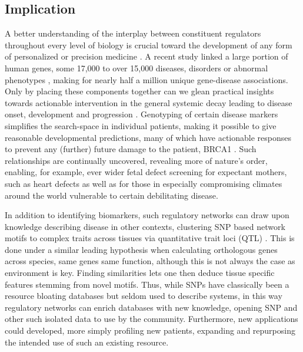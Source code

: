 \subsection{Implication}
\label{sec:practical}
A better understanding of the interplay between constituent regulators throughout every level of biology is crucial toward the development of any form of personalized or precision medicine \citep{barabasi2011network}. A recent study linked a large portion of human genes, some 17,000 to over 15,000 diseases, disorders or abnormal phenotypes \citep{pinero2015disgenet}, making for nearly half a million unique gene-disease associations. Only by placing these components together can we glean practical insights towards actionable intervention in the general systemic decay leading to disease onset, development and progression \citep{flores2013p4}. Genotyping of certain disease markers simplifies the search-space in individual patients, making it possible to give reasonable developmental predictions, many of which have actionable responses to prevent any (further) future damage to the patient, \eg BRCA1 \citep{lerman1996brca1}. Such relationships are continually uncovered, revealing more of nature's order, enabling, for example, ever wider fetal defect screening for expectant mothers, such as heart defects \citep{hyett1999using} as well as for those in especially compromising climates around the world vulnerable to certain debilitating disease.

In addition to identifying biomarkers, such regulatory networks can draw upon knowledge describing disease in other contexts, \eg clustering SNP based network motifs to complex traits across tissues via quantitative trait loci (QTL) \citep{platig2016bipartite}. This is done under a similar leading hypothesis when calculating orthologous genes across species, \ie same genes same function, although this is not always the case as environment is key. Finding similarities lets one then deduce tissue specific features stemming from novel motifs. Thus, while SNPs have classically been a resource bloating databases but seldom used to describe systems, in this way regulatory networks can enrich databases with new knowledge, opening SNP and other such isolated data to use by the community. Furthermore, new applications could developed, \eg more simply profiling new patients, expanding and repurposing the intended use of such an existing resource. 

